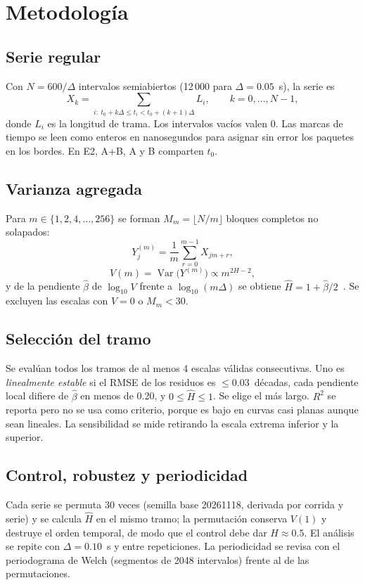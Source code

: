 \documentclass[conference,letterpaper]{IEEEtran}
\newcommand{\Hhat}{\hat{H}}
\newcommand{\bhat}{\hat{\beta}}
\begin{document}
\section{Metodología}
\subsection{Serie regular}
Con $N = 600/\Delta$ intervalos semiabiertos (12\,000 para $\Delta = 0.05$~s), la serie es
\begin{equation}
X_k = \sum_{i:\; t_0 + k\Delta \le t_i < t_0 + (k+1)\Delta} L_i, \qquad k = 0,\dots,N-1,
\end{equation}
donde $L_i$ es la longitud de trama. Los intervalos vacíos valen 0. Las marcas de tiempo se leen como enteros en nanosegundos para asignar sin error los paquetes en los bordes. En E2, A+B, A y B comparten $t_0$.

\subsection{Varianza agregada}
Para $m \in \{1,2,4,\dots,256\}$ se forman $M_m = \lfloor N/m \rfloor$ bloques completos no solapados:
\begin{equation}
Y_j^{(m)} = \frac{1}{m}\sum_{r=0}^{m-1} X_{jm+r},
\end{equation}
\begin{equation}
V(m) = \operatorname{Var}\big(Y^{(m)}\big) \propto m^{2H-2},
\end{equation}
y de la pendiente $\bhat$ de $\log_{10} V$ frente a $\log_{10}(m\Delta)$ se obtiene $\Hhat = 1 + \bhat/2$~\cite{beran94,taqqu95}. Se excluyen las escalas con $V = 0$ o $M_m < 30$.

\subsection{Selección del tramo}
Se evalúan todos los tramos de al menos 4 escalas válidas consecutivas. Uno es \emph{linealmente estable} si el RMSE de los residuos es $\le 0.03$~décadas, cada pendiente local difiere de $\bhat$ en menos de 0.20, y $0 \le \Hhat \le 1$. Se elige el más largo. $R^2$ se reporta pero no se usa como criterio, porque es bajo en curvas casi planas aunque sean lineales. La sensibilidad se mide retirando la escala extrema inferior y la superior.

\subsection{Control, robustez y periodicidad}
Cada serie se permuta 30 veces (semilla base 20261118, derivada por corrida y serie) y se calcula $\Hhat$ en el mismo tramo; la permutación conserva $V(1)$ y destruye el orden temporal, de modo que el control debe dar $H \approx 0.5$. El análisis se repite con $\Delta = 0.10$~s y entre repeticiones. La periodicidad se revisa con el periodograma de Welch (segmentos de 2048 intervalos) frente al de las permutaciones.
\end{document}
